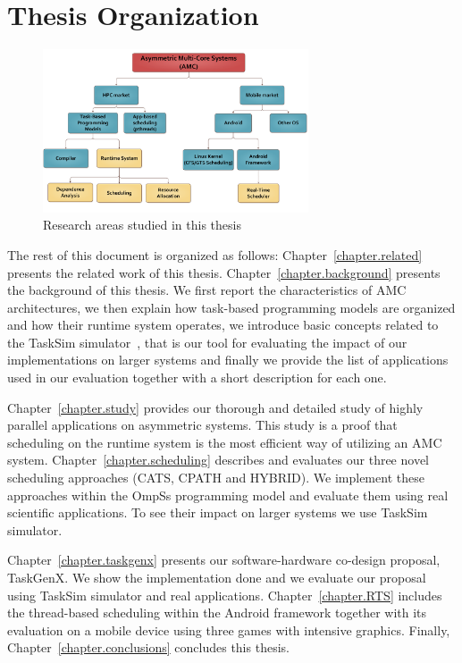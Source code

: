 \section{Thesis Organization}
\begin{figure}[t]%
	\centering
	\includegraphics[width=0.7\textwidth]{figures/research_areas.pdf}
	\caption{Research areas studied in this thesis}
	\label{fig:research_areas}
\end{figure}
The rest of this document is organized as follows: 
Chapter~\ref{chapter.related} presents the related work of this thesis.
Chapter~\ref{chapter.background} presents the background of this thesis.
We first report the characteristics of AMC architectures, we then explain how task-based programming models are organized and how their runtime system operates, we introduce basic concepts related to the TaskSim simulator~\cite{AbstrLevels_TACO12}, that is our tool for evaluating the impact of our implementations on larger systems and finally we provide the list of applications used in our evaluation together with a short description for each one.

Chapter~\ref{chapter.study} provides our thorough and detailed study of highly parallel applications on asymmetric systems.
This study is a proof that scheduling on the runtime system is the most efficient way of utilizing an AMC system.
Chapter~\ref{chapter.scheduling} describes and evaluates our three novel scheduling approaches (CATS, CPATH and HYBRID). 
We implement these approaches within the OmpSs programming model and evaluate them using real scientific applications.
To see their impact on larger systems we use TaskSim simulator.

Chapter~\ref{chapter.taskgenx} presents our software-hardware co-design proposal, TaskGenX.
We show the implementation done and we evaluate our proposal using TaskSim simulator and real applications.
Chapter~\ref{chapter.RTS} includes the thread-based scheduling within the Android framework together with its evaluation on a mobile device using three games with intensive graphics.
Finally, Chapter~\ref{chapter.conclusions} concludes this thesis.

